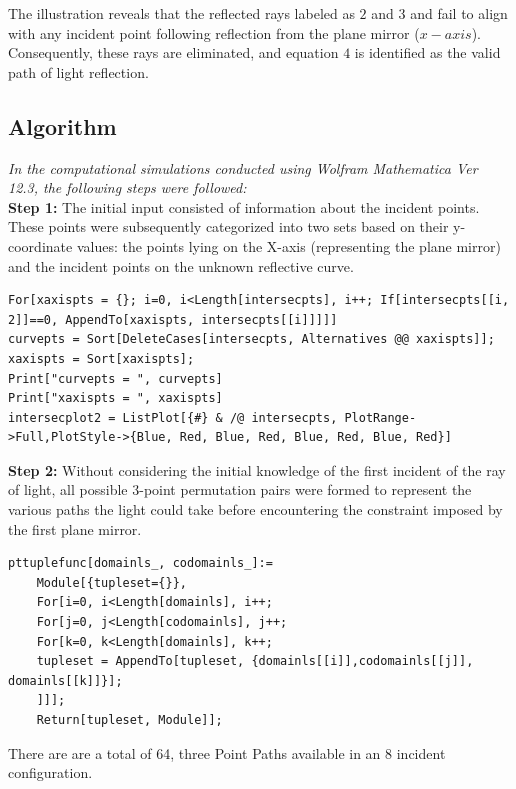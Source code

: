 \documentclass[12pt,a4paper,twoside]{report}
\begin{document}
The illustration reveals that the reflected rays labeled as $2$ and $3$ and fail to align with any incident point following reflection from the plane mirror ($x-axis$). Consequently, these rays are eliminated, and equation $4$ is identified as the valid path of light reflection.

\subsection{Algorithm}

\textit{In the computational simulations conducted using Wolfram Mathematica Ver 12.3, the following steps were followed:}\\

\textbf{Step 1:} The initial input consisted of information about the incident points. These points were subsequently categorized into two sets based on their y-coordinate values: the points lying on the X-axis (representing the plane mirror) and the incident points on the unknown reflective curve. \\

\begin{lstlisting}[style=mathematica]
For[xaxispts = {}; i=0, i<Length[intersecpts], i++; If[intersecpts[[i, 2]]==0, AppendTo[xaxispts, intersecpts[[i]]]]]
curvepts = Sort[DeleteCases[intersecpts, Alternatives @@ xaxispts]];
xaxispts = Sort[xaxispts];
Print["curvepts = ", curvepts]
Print["xaxispts = ", xaxispts]
intersecplot2 = ListPlot[{#} & /@ intersecpts, PlotRange->Full,PlotStyle->{Blue, Red, Blue, Red, Blue, Red, Blue, Red}]
\end{lstlisting}



\textbf{Step 2:} Without considering the initial knowledge of the first incident of the ray of light, all possible 3-point permutation pairs were formed to represent the various paths the light could take before encountering the constraint imposed by the first plane mirror. 

\begin{lstlisting}[style=mathematica]
	pttuplefunc[domainls_, codomainls_]:=
	Module[{tupleset={}},
	For[i=0, i<Length[domainls], i++;
	For[j=0, j<Length[codomainls], j++;
	For[k=0, k<Length[domainls], k++;
	tupleset = AppendTo[tupleset, {domainls[[i]],codomainls[[j]], domainls[[k]]}];
	]]];
	Return[tupleset, Module]];
\end{lstlisting}
There are are a total of 64, three Point Paths available in an 8 incident configuration.
\end{document}
